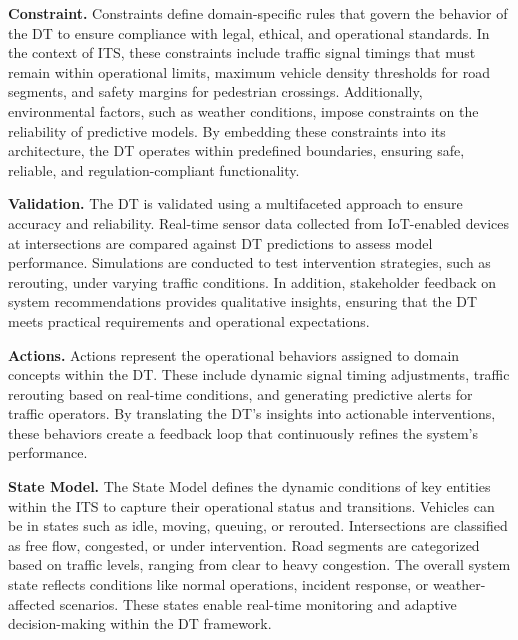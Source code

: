 \textbf{Constraint.} Constraints define domain-specific rules that govern the behavior of the DT to ensure compliance with legal, ethical, and operational standards. In the context of ITS, these constraints include traffic signal timings that must remain within operational limits, maximum vehicle density thresholds for road segments, and safety margins for pedestrian crossings. Additionally, environmental factors, such as weather conditions, impose constraints on the reliability of predictive models. By embedding these constraints into its architecture, the DT operates within predefined boundaries, ensuring safe, reliable, and regulation-compliant functionality.


\textbf{Validation.} The DT is validated using a multifaceted approach to ensure accuracy and reliability. Real-time sensor data collected from IoT-enabled devices at intersections are compared against DT predictions to assess model performance. Simulations are conducted to test intervention strategies, such as rerouting, under varying traffic conditions. In addition, stakeholder feedback on system recommendations provides qualitative insights, ensuring that the DT meets practical requirements and operational expectations.













\textbf{Actions.} Actions represent the operational behaviors assigned to domain concepts within the DT. These include dynamic signal timing adjustments, traffic rerouting based on real-time conditions, and generating predictive alerts for traffic operators. By translating the DT's insights into actionable interventions, these behaviors create a feedback loop that continuously refines the system's performance.

\textbf{State Model.} The State Model defines the dynamic conditions of key entities within the ITS to capture their operational status and transitions. Vehicles can be in states such as idle, moving, queuing, or rerouted. Intersections are classified as free flow, congested, or under intervention. Road segments are categorized based on traffic levels, ranging from clear to heavy congestion. The overall system state reflects conditions like normal operations, incident response, or weather-affected scenarios. These states enable real-time monitoring and adaptive decision-making within the DT framework.


